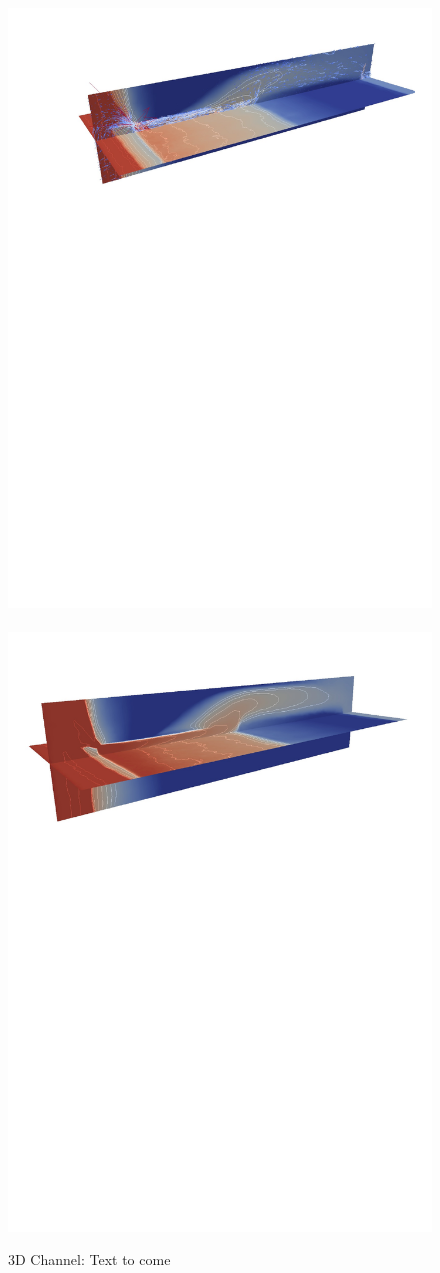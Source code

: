\begin{figure}[ht]
{        \hbox{\hspace{-3.cm}
            \includegraphics[width=.70\textwidth]{./Pics1/3D_ChannelAdaptive/Test_SlowNewAdapt_200_ContourPlotSlice_b}
            \includegraphics[width=.70\textwidth]{./Pics1/3D_ChannelAdaptive/Test_SlowNewAdapt_288_ContourPlotSlice_b}}
}
\caption{3D Channel: Text to come }
\end{figure}
\clearpage


